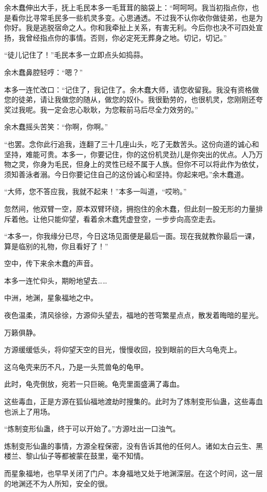 \begin{this_body}
余木蠢伸出大手，抚上毛民本多一毛茸茸的脑袋上：“呵呵呵。我当初指点你，也是看你比寻常毛民多一些机灵多变。心思通透。不过我不认你收你做徒弟，也是为你好。我是逃脱宿命之人。你和我牵扯上关系，有害无利。今后你也决不可四处宣扬，我曾经指点你的事情。否则，你必定死无葬身之地。切记，切记。”

“徒儿记住了！”毛民本多一立即点头如捣蒜。

余木蠢鼻腔轻哼：“嗯？”

本多一连忙改口：“记住了，我记住了。余木蠢大师，请您收留我。我没有资格做您的徒弟，请让我做您的随从，做您的奴仆。我很勤劳的，也很机灵，您刚刚还夸奖过我呢。我一定会忠心耿耿，为您鞍前马后尽全力效劳的。”

余木蠢摇头苦笑：“你啊，你啊。”

“也罢。念你此行追我，连翻了三十几座山头，吃了无数苦头。这份向道的诚心和坚持，难能可贵。本多一，你要记住，你的这份机灵劲儿是你突出的优点。人乃万物之灵，你身为毛民，但身上的灵性已经不属于人族。但你不可以将此作为依仗，须知善泳者溺。今日你要记住自己的这份诚心和坚持。你起来吧。”余木蠢道。

“大师，您不答应我，我就不起来！”本多一叫道，“哎哟。”

忽然间，他双臂一空，原本双臂环绕，拥抱住的余木蠢，但此刻一股无形的力量排斥着他。让他只能仰望，看着余木蠢凭虚登空，一步步向高空走去。

“本多一，你我缘分已尽，今日这场见面便是最后一面。现在我就教你最后一课，算是临别的礼物，你且看好了！”

空中，传下来余木蠢的声音。

本多一连忙仰头，期盼地望去……

中洲，地渊，星象福地之中。

夜色温柔，清风徐徐，方源仰头望去，福地的苍穹繁星点点，散发着晦暗的星光。

万籁俱静。

方源缓缓低头，将仰望天空的目光，慢慢收回，投到眼前的巨大乌龟壳上。

这乌龟壳来历不凡，乃是一头荒兽龟的龟甲。

此时，龟壳倒放，宛若一只巨碗。龟壳里面盛满了毒血。

这些毒血，正是方源在狐仙福地渡劫时搜集的。此时为了炼制变形仙蛊，这些毒血也派上了用场。

“炼制变形仙蛊，终于可以开始了。”方源吐出一口浊气。

炼制变形仙蛊的事情，方源全程保密，没有告诉其他的任何人。诸如太白云生、黑楼兰、黎山仙子等都被蒙在鼓里，毫不知情。

而星象福地，也早早关闭了门户。本身福地又处于地渊深层。在这个时间，这一层的地渊还不为人所知，安全的很。


\end{this_body}
